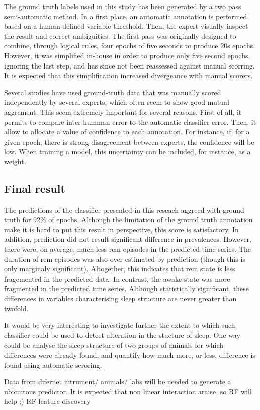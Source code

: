 The ground truth labels used in this study has been generated by a two pass semi-automatic method.
In a first place, an automatic annotation is performed based on a human-defined variable threshold.
Then, the expert visually inspect the result and correct ambiguities.
The first pass was originally designed to combine, through logical rules, four epochs of five seconds to produce 20s epochs\citationneeded{}.
However, it was simplified in-house in order to produce
only five second epochs, ignoring the last step, and has since not been reassessed against manual scorring.
It is expected that this simplification increased divergeance with manual scorers.

Several studies have used ground-truth data that was manually scored independently by several experts, 
which often seem to show good mutual aggrement. 
This seem extremely important for several reasons.
First of all, it permits to compare inter-humman error to the automatic classifier error.
Then, it allow to allocate a value of confidence to each annotation. 
For instance, if, for a given epoch, there is strong disagreement between experts, the confidence will be low.
When training a model, this uncertainty can be included, for instance, as a weight.

\subsection{Final result}
The predictions of the classifier presented in this reseach aggreed with ground truth for 92\% of epochs.
Although the limitation of the ground truth annotation make it is hard to put this result in perspective,
this score is satisfactory. In addition, prediction did not result significant difference in prevalences.
However, there were, on average, much less \gls{rem} episodes in the predicted time series. 
The duration of \gls{rem} episodes was also over-estimated by prediction (though this is only marginaly significant).
Altogether, this indicates that \gls{rem} state is less fragemented in the predicted data.
In contrast, the awake state was more fragmented in the predicted time series.
Although statistically significant, these differences in variables characterising sleep structure are never greater than twofold.

It would be very interesting to investigate further the extent to which such classifier could be used to detect alteration 
in the stucture of sleep.
One way could be analyse the sleep structure of two groups of animals for which differences were already found, and quantify how much more, or less,
difference is found using automatic scroring.

Data from difernet intrument/ animals/ labs will be needed to generate a ubicuitous predictor.
It is expected that non linear interaction araise, so RF will help ;)
RF feature discovery
